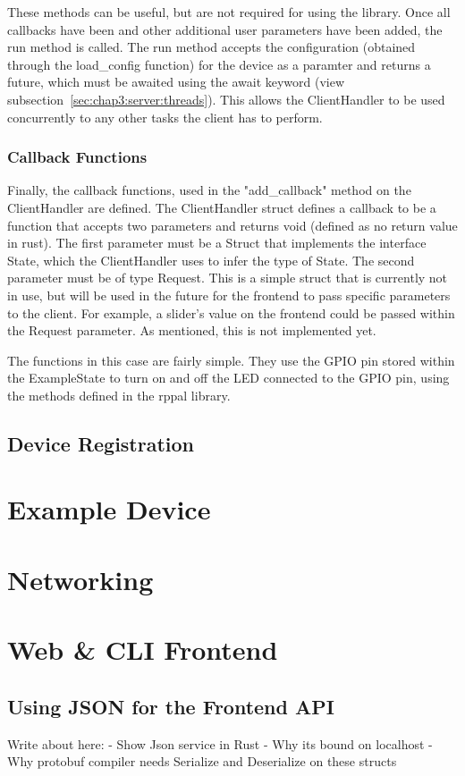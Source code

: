 These methods can be useful, but are not required for using the library. Once all callbacks have been and other additional user parameters have been added, the run method is called. The run method accepts the configuration (obtained through the load\_config function) for the device as a paramter and returns a future, which must be awaited using the await keyword (view subsection~\ref{sec:chap3:server:threads}). This allows the ClientHandler to be used concurrently to any other tasks the client has to perform.

\subsubsection{Callback Functions}
Finally, the callback functions, used in the "add\_callback" method on the ClientHandler are defined. The ClientHandler struct defines a callback to be a function that accepts two parameters and returns void (defined as no return value in rust). The first parameter must be a Struct that implements the interface State, which the ClientHandler uses to infer the type of State. The second parameter must be of type Request. This is a simple struct that is currently not in use, but will be used in the future for the frontend to pass specific parameters to the client. For example, a slider's value on the frontend could be passed within the Request parameter. As mentioned, this is not implemented yet.

The functions in this case are fairly simple. They use the GPIO pin stored within the ExampleState to turn on and off the LED connected to the GPIO pin, using the methods defined in the rppal library.

\subsection{Device Registration} \label{sec:chap3:devicelib:registration}
\section{Example Device} \label{sec:chap3:deviceexample}
\section{Networking}

\section{Web \& CLI Frontend} \label{sec:chap3:frontend}
\subsection{Using JSON for the Frontend API} \label{sec:chap3:frontend:json}
Write about here:
- Show Json service in Rust
- Why its bound on localhost
- Why protobuf compiler needs Serialize and Deserialize on these structs
